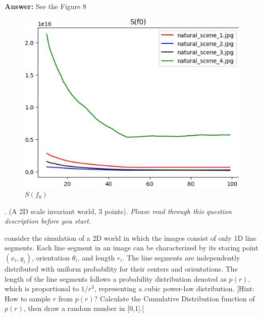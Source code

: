 \documentclass[11pt]{article}
\newcommand{\Answer}{\color{red}\textbf{Answer:} \color{black}}
\begin{document}
\begin{enumerate}
\Answer See the Figure 8
\begin{figure}[h]
    \centering
    \includegraphics[scale=0.5]{pro2_result/S_f0.jpg}
    \caption{$S(f_0)$}
\end{figure}

\end{enumerate}

\clearpage

. (A 2D scale invariant world, 3 points). \emph{Please read through this question description before you start.}
 
 consider the simulation of a 2D world in which the images consist of only 1D line segments. Each line segment in an image can be characterized by its staring point $(x_i, y_i)$, orientation $\theta_i$, and length $r_i$. The line segments are independently distributed with uniform probability for their centers and orientations. The length of the line segments follows a probability distribution denoted as $p(r)$, which is proportional to $1/r^3$, representing a cubic power-law distribution. [Hint: How to sample $r$ from $p(r)$? Calculate the Cumulative Distribution function of $p(r)$, then draw a random number in [0,1].]
\end{document}
